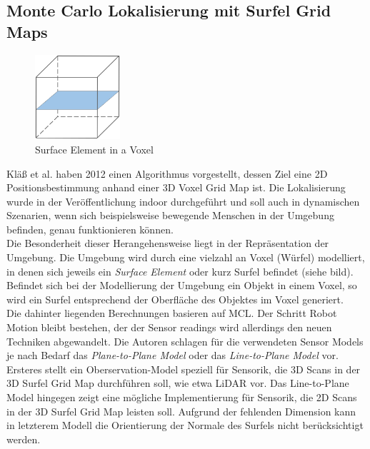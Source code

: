 \subsection{Monte Carlo Lokalisierung mit Surfel Grid Maps}\label{subsec:mcl_surfel}
\begin{figure}
    \centering
    \includegraphics[width=0.28\textwidth]{pic/loesungen/12_surfel.png}
    \caption{Surface Element in a Voxel}
    \label{fig:surfel}
\end{figure}
Kläß et al. \cite{3DsurfelGridMaps} haben 2012 einen Algorithmus vorgestellt, dessen Ziel eine 2D Positionsbestimmung anhand einer 3D Voxel Grid Map ist. Die Lokalisierung wurde in der Veröffentlichung indoor durchgeführt und soll auch in dynamischen Szenarien, wenn sich beispielsweise bewegende Menschen in der Umgebung befinden, genau funktionieren können.\\
Die Besonderheit dieser Herangehensweise liegt in der Repräsentation der Umgebung. Die Umgebung wird durch eine vielzahl an Voxel (Würfel) modelliert, in denen sich jeweils ein \textit{Surface Element} oder kurz Surfel befindet (siehe bild). Befindet sich bei der Modellierung der Umgebung ein Objekt in einem Voxel, so wird ein Surfel entsprechend der Oberfläche des Objektes im Voxel generiert.\\
Die dahinter liegenden Berechnungen basieren auf MCL. Der Schritt Robot Motion bleibt bestehen, der der Sensor readings wird allerdings den neuen Techniken abgewandelt. Die Autoren schlagen für die verwendeten Sensor Models je nach Bedarf das \textit{Plane-to-Plane Model} oder das \textit{Line-to-Plane Model} vor. Ersteres stellt ein Oberservation-Model speziell für Sensorik, die 3D Scans in der 3D Surfel Grid Map durchführen soll, wie etwa LiDAR vor. Das Line-to-Plane Model hingegen zeigt eine mögliche Implementierung für Sensorik, die 2D Scans in der 3D Surfel Grid Map leisten soll. Aufgrund der fehlenden Dimension kann in letzterem Modell die Orientierung der Normale des Surfels nicht berücksichtigt werden.\\
